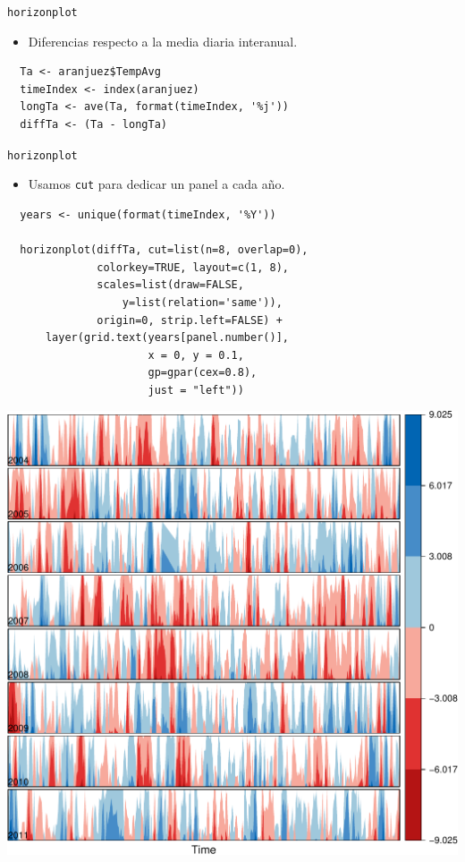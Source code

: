 \documentclass[xcolor={usenames,svgnames,dvipsnames}]{beamer}
\begin{document}
\begin{frame}[fragile,label=sec-3-3-4]{\texttt{horizonplot}}
 \begin{itemize}
\item Diferencias respecto a la media diaria interanual.
\end{itemize}
\lstset{language=R,label= ,caption= ,numbers=none}
\begin{lstlisting}
  Ta <- aranjuez$TempAvg
  timeIndex <- index(aranjuez)
  longTa <- ave(Ta, format(timeIndex, '%j'))
  diffTa <- (Ta - longTa)
\end{lstlisting}
\end{frame}

\begin{frame}[fragile,label=sec-3-3-5]{\texttt{horizonplot}}
 \begin{itemize}
\item Usamos \texttt{cut} para dedicar un panel a cada año.
\end{itemize}
\lstset{language=R,label= ,caption= ,numbers=none}
\begin{lstlisting}
  years <- unique(format(timeIndex, '%Y'))
  
  horizonplot(diffTa, cut=list(n=8, overlap=0),
              colorkey=TRUE, layout=c(1, 8),
              scales=list(draw=FALSE,
                  y=list(relation='same')),
              origin=0, strip.left=FALSE) +
      layer(grid.text(years[panel.number()],
                      x = 0, y = 0.1, 
                      gp=gpar(cex=0.8),
                      just = "left"))
\end{lstlisting}
\end{frame}

\begin{frame}[label=sec-3-3-6]{}
\includegraphics[width=.9\linewidth]{figs/diffTa_horizon.pdf}
\end{frame}
\end{document}
